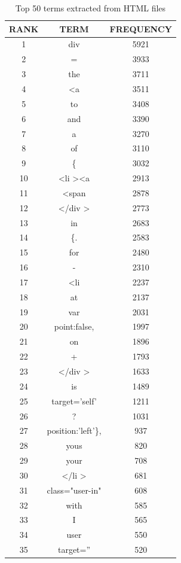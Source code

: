 \documentclass[12pt]{Report}
\begin{document}
\begin{table}
\caption{ Top 50 terms extracted from HTML files}
\begin{center}
\begin{tabular}{ c | c | c }
 \hline
 RANK & TERM & FREQUENCY \\ \hline
1 &div &5921\\ \hline
2 &= &3933\\ \hline
3 &the &3711\\ \hline
4 &<a &3511\\ \hline
5 &to &3408\\ \hline
6 &and &3390\\ \hline
7 &a &3270\\ \hline
8 &of &3110\\ \hline
9 & \{&3032\\ \hline
10 &\textless li \textgreater \textless a &2913\\ \hline
11 &\textless span &2878\\ \hline
12 &\textless /div \textgreater &2773\\ \hline
13 &in &2683\\ \hline
14 &\{. &2583\\ \hline
15 &for &2480\\ \hline
16 &- &2310\\ \hline
17 & \textless li &2237\\ \hline
18 &at &2137\\ \hline
19 &var &2031\\ \hline
20 &point:false, &1997\\ \hline
21 &on &1896\\ \hline
22 &+ &1793\\ \hline
23 &\textless /div \textgreater &1633\\ \hline
24 &is &1489\\ \hline
25 & target='self' & 1211\\ \hline
26 &? &1031\\ \hline
27 &position:'left'\}, &937\\ \hline
28 &yous &820\\ \hline
29 &your &708\\ \hline
30 & \textless /li \textgreater&681\\ \hline
31 &class="user-in" &608\\ \hline
32 &with &585\\ \hline
33 &I &565\\ \hline
34 &user &550\\ \hline
35 &target='' &520\\ \hline

\end{tabular}
\end{center}
\end{table}
\end{document}
